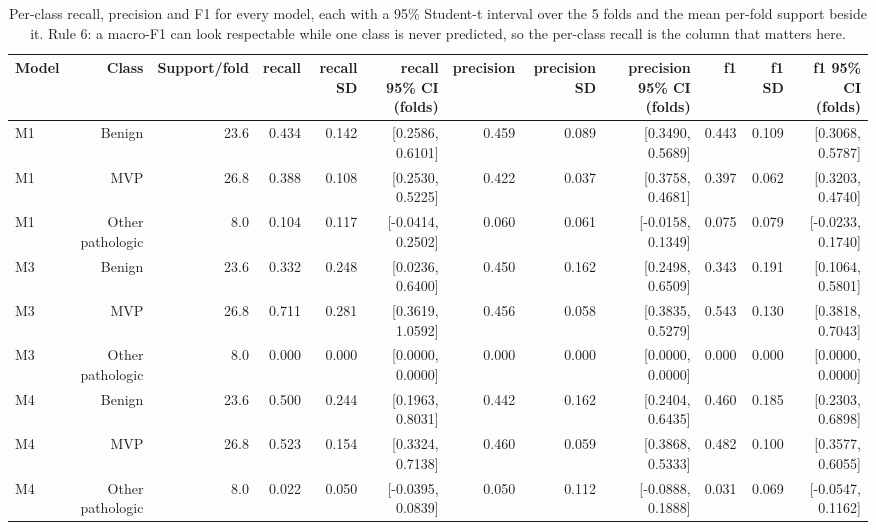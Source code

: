\begin{table}[htbp]
  \centering
  \caption{Per-class recall, precision and F1 for every model, each with a 95\% Student-t interval over the 5 folds and the mean per-fold support beside it. Rule 6: a macro-F1 can look respectable while one class is never predicted, so the per-class recall is the column that matters here.}
  \label{tab:t-s4}
  \begin{tabular}{lrrrrrrrrrrr}
    \toprule
    Model & Class & Support/fold & recall & recall SD & recall 95\% CI (folds) & precision & precision SD & precision 95\% CI (folds) & f1 & f1 SD & f1 95\% CI (folds) \\
    \midrule
    M1 & Benign & 23.6 & 0.434 & 0.142 & [0.2586, 0.6101] & 0.459 & 0.089 & [0.3490, 0.5689] & 0.443 & 0.109 & [0.3068, 0.5787] \\
    M1 & MVP & 26.8 & 0.388 & 0.108 & [0.2530, 0.5225] & 0.422 & 0.037 & [0.3758, 0.4681] & 0.397 & 0.062 & [0.3203, 0.4740] \\
    M1 & Other pathologic & 8.0 & 0.104 & 0.117 & [-0.0414, 0.2502] & 0.060 & 0.061 & [-0.0158, 0.1349] & 0.075 & 0.079 & [-0.0233, 0.1740] \\
    M3 & Benign & 23.6 & 0.332 & 0.248 & [0.0236, 0.6400] & 0.450 & 0.162 & [0.2498, 0.6509] & 0.343 & 0.191 & [0.1064, 0.5801] \\
    M3 & MVP & 26.8 & 0.711 & 0.281 & [0.3619, 1.0592] & 0.456 & 0.058 & [0.3835, 0.5279] & 0.543 & 0.130 & [0.3818, 0.7043] \\
    M3 & Other pathologic & 8.0 & 0.000 & 0.000 & [0.0000, 0.0000] & 0.000 & 0.000 & [0.0000, 0.0000] & 0.000 & 0.000 & [0.0000, 0.0000] \\
    M4 & Benign & 23.6 & 0.500 & 0.244 & [0.1963, 0.8031] & 0.442 & 0.162 & [0.2404, 0.6435] & 0.460 & 0.185 & [0.2303, 0.6898] \\
    M4 & MVP & 26.8 & 0.523 & 0.154 & [0.3324, 0.7138] & 0.460 & 0.059 & [0.3868, 0.5333] & 0.482 & 0.100 & [0.3577, 0.6055] \\
    M4 & Other pathologic & 8.0 & 0.022 & 0.050 & [-0.0395, 0.0839] & 0.050 & 0.112 & [-0.0888, 0.1888] & 0.031 & 0.069 & [-0.0547, 0.1162] \\

\end{tabular}
\end{table}
